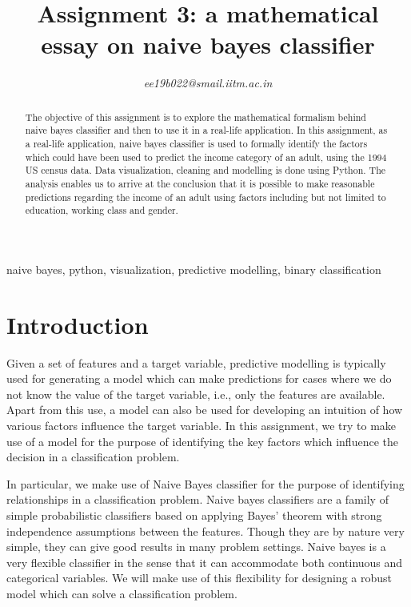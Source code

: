\documentclass[conference]{IEEEtran}
\begin{document}
\title{Assignment 3: a mathematical essay on naive bayes classifier\\}


\author{
\textit{ee19b022@smail.iitm.ac.in}

}

\maketitle

\begin{abstract}
The objective of this assignment is to explore the mathematical formalism behind naive bayes classifier and then to use it in a real-life application. In this assignment, as a real-life application, naive bayes classifier is used to formally identify the factors which could have been used to  predict the income category of an adult, using the 1994 US census data. Data visualization, cleaning and modelling is done using Python. The analysis enables us to arrive at the conclusion that it is possible to make reasonable predictions regarding the income of an adult using factors including but not limited to education, working class and gender. 
\end{abstract}

\begin{IEEEkeywords}
naive bayes, python, visualization, predictive modelling, binary classification
\end{IEEEkeywords}

\section{Introduction}

Given a set of features and a target variable, predictive modelling is typically used for generating a model which can make predictions for cases where we do not know the value of the target variable, i.e., only the features are available. Apart from this use, a model can also be used for developing an intuition of how various factors influence the target variable. In this assignment, we try to make use of a model for the purpose of identifying the key factors which influence the decision in a classification problem.

In particular, we make use of Naive Bayes classifier for the purpose of identifying relationships in a classification problem. Naive bayes classifiers are a family of simple probabilistic classifiers based on applying Bayes' theorem with strong independence assumptions between the features. Though they are by nature very simple, they can give good results in many problem settings. Naive bayes is a very flexible classifier in the sense that it can accommodate both continuous and categorical variables. We will make use of this flexibility for designing a robust model which can solve a classification problem. 
\end{document}
